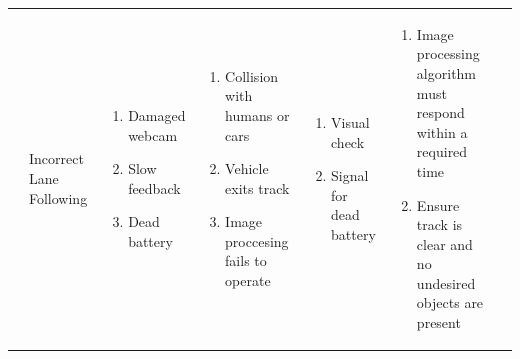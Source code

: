 \documentclass [10pt]{article}
\begin{document}
{\begin{minipage}{\textwidth}
\begin{longtable}{ |p{ }  | p{ } |  p{ } |  p{ } | p{ } | p{ } |  p{ }|}
    \cellcolor{subsectionC}
    &  \cellcolor{tableCell}\begin{minipage} {.19\columnwidth}
            \begin{center}Incorrect  Lane Following \end{center}
        \end{minipage} 
    & \cellcolor{tableCell}\begin{minipage}{.22\columnwidth} 
                \begin{enumerate}
                    \item Damaged webcam
                    \item Slow feedback
                    \item Dead battery \vspace {1mm}
                \end{enumerate}
        \end{minipage}
    & \cellcolor{tableCell}\begin{minipage}{.22\columnwidth} 
                \vspace{2mm}
                \begin{enumerate}
                    \item Collision with humans or cars
                    \item Vehicle exits track
                    \item Image proccesing fails to operate \vspace {1mm}
                \end{enumerate}
        \end{minipage}
    & \cellcolor{tableCell}\begin{minipage}{.18\columnwidth} 
                \begin{enumerate}
                    \item Visual check
                    \item Signal for dead battery \vspace {1mm}
                \end{enumerate}
        \end{minipage}
    & \cellcolor{tableCell}\begin{minipage}{.23\columnwidth} 
                \vspace{2mm}
                \begin{enumerate}
                    \item Image processing algorithm must respond within a required time
                    \item Ensure track is clear and no undesired objects are present\vspace {1mm}
                \end{enumerate}
        \end{minipage}
    

\end{longtable}
\end{minipage}}
\end{document}
